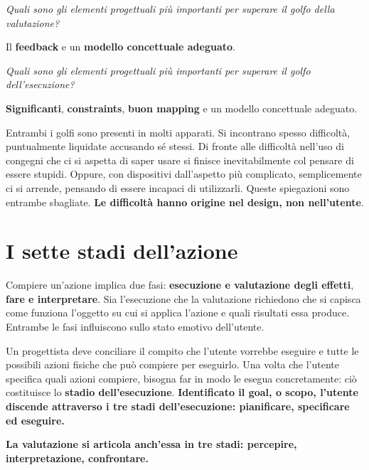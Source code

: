 \pagebreak

\begin{flushleft}
	\textit{
		Quali sono gli elementi progettuali più importanti per superare il golfo della valutazione?}
\end{flushleft}

Il \textbf{feedback} e un \textbf{modello concettuale adeguato}.

\begin{flushleft}
	\textit{Quali sono gli elementi progettuali più importanti per superare il golfo dell'esecuzione?}
\end{flushleft}
\textbf{Significanti}, \textbf{constraints}, \textbf{buon mapping} e un modello concettuale adeguato.

Entrambi i golfi sono presenti in molti apparati. Si incontrano spesso difficoltà, puntualmente liquidate accusando sé stessi. Di fronte alle difficoltà nell'uso di congegni che ci si aspetta di saper usare si finisce inevitabilmente col pensare di essere stupidi. Oppure, con dispositivi dall'aspetto più complicato, semplicemente ci si arrende, pensando di essere incapaci di utilizzarli. Queste spiegazioni sono entrambe sbagliate. \textbf{Le difficoltà hanno origine nel design, non nell'utente}.

\section{I sette stadi dell'azione}
Compiere un'azione implica due fasi: \textbf{esecuzione e valutazione degli effetti}, \textbf{fare e interpretare}. Sia l'esecuzione che la valutazione richiedono che si capisca come funziona l'oggetto su cui si applica l'azione e quali risultati essa produce. Entrambe le fasi influiscono sullo stato emotivo dell'utente.

Un progettista deve conciliare il compito che l'utente vorrebbe eseguire e tutte le possibili azioni fisiche che può compiere per eseguirlo. Una volta che l'utente specifica quali azioni compiere, bisogna far in modo le esegua concretamente: ciò costituisce lo \textbf{stadio dell'esecuzione}. \textbf{Identificato il goal, o scopo, l'utente discende attraverso i tre stadi dell'esecuzione: pianificare, specificare ed eseguire.}

\textbf{La valutazione si articola anch'essa in tre stadi: percepire, interpretazione, confrontare.}

